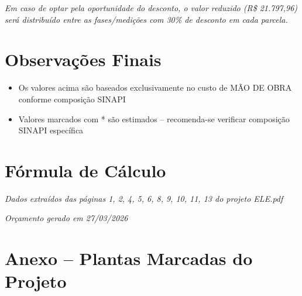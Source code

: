 \documentclass[12pt,a4paper]{article}
\begin{document}
\noindent\textit{Em caso de optar pela oportunidade do desconto, o valor reduzido (R\$ 21.797,96) será distribuído entre as fases/medições com 30\% de desconto em cada parcela.}

\pagebreak

\section{Observações Finais}

\begin{itemize}
\item Os valores acima são baseados exclusivamente no custo de MÃO DE OBRA conforme composição SINAPI
\item Valores marcados com * são estimados -- recomenda-se verificar composição SINAPI específica
\end{itemize}

\section{Fórmula de Cálculo}

\begin{center}
\end{center}

\vfill

\noindent\textit{Dados extraídos das páginas 1, 2, 4, 5, 6, 8, 9, 10, 11, 13 do projeto ELE.pdf}
\par\noindent\textit{Orçamento gerado em 27/03/2026}

\pagebreak

\section{Anexo -- Plantas Marcadas do Projeto}
\end{document}
